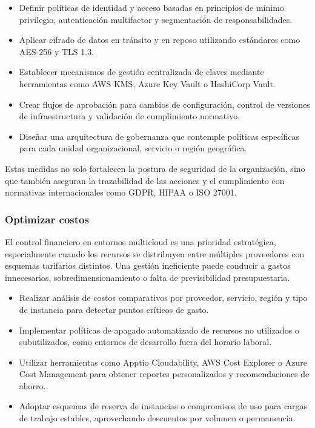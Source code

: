 {                \begin{itemize}
                    \item Definir políticas de identidad y acceso basadas en principios de mínimo privilegio, autenticación multifactor y segmentación de responsabilidades.
                    \item Aplicar cifrado de datos en tránsito y en reposo utilizando estándares como AES-256 y TLS 1.3.
                    \item Establecer mecanismos de gestión centralizada de claves mediante herramientas como AWS KMS, Azure Key Vault o HashiCorp Vault.
                    \item Crear flujos de aprobación para cambios de configuración, control de versiones de infraestructura y validación de cumplimiento normativo.
                    \item Diseñar una arquitectura de gobernanza que contemple políticas específicas para cada unidad organizacional, servicio o región geográfica.
                \end{itemize}
                
                Estas medidas no solo fortalecen la postura de seguridad de la organización, sino que también aseguran la trazabilidad de las acciones y el cumplimiento con normativas internacionales como GDPR, HIPAA o ISO 27001.
                
            \subsubsection{Optimizar costos}
                El control financiero en entornos multicloud es una prioridad estratégica, especialmente cuando los recursos se distribuyen entre múltiples proveedores con esquemas tarifarios distintos. Una gestión ineficiente puede conducir a gastos innecesarios, sobredimensionamiento o falta de previsibilidad presupuestaria.
                
                \begin{itemize}
                    \item Realizar análisis de costos comparativos por proveedor, servicio, región y tipo de instancia para detectar puntos críticos de gasto.
                    \item Implementar políticas de apagado automatizado de recursos no utilizados o subutilizados, como entornos de desarrollo fuera del horario laboral.
                    \item Utilizar herramientas como Apptio Cloudability, AWS Cost Explorer o Azure Cost Management para obtener reportes personalizados y recomendaciones de ahorro.
                    \item Adoptar esquemas de reserva de instancias o compromisos de uso para cargas de trabajo estables, aprovechando descuentos por volumen o permanencia.
                \end{itemize}
                
}
